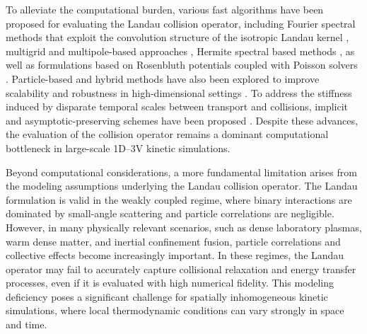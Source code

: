 \documentclass[preprint,1p,times]{elsarticle}
\theoremstyle{definition}
\theoremstyle{remark}
\begin{document}
To alleviate the computational burden, various fast algorithms have been proposed for evaluating the Landau collision operator, including Fourier spectral methods that exploit the convolution structure of the isotropic Landau kernel \cite{pareschi2000fast,filbet2002numerical,zhang2017conservative}, multigrid and multipole-based approaches \cite{buet1997fast,lemou1998multipole},  Hermite spectral based methods \cite{wang2019approximation,li2020approximation,li2021hermite}, as well as formulations based on Rosenbluth potentials \cite{Rosenbluth_PR_1957} coupled with Poisson solvers \cite{chacon2000implicit,taitano2016adaptive}. Particle-based and hybrid methods have also been explored to improve scalability and robustness in high-dimensional settings \cite{takizuka1977binary,Carrillo_JCP_2020,bailo2024collisional,Hauck_Hu_JSP_2025}. 
To address the stiffness induced by disparate temporal scales between transport and collisions, implicit and asymptotic-preserving schemes have been proposed \cite{epperlein1994implicit,chacon2000implicit,lemou2005implicit,filbet2010class,jin2011class}. 
Despite these advances, the evaluation of the collision operator remains a dominant computational bottleneck in large-scale 1D–3V kinetic simulations.

Beyond computational considerations, a more fundamental limitation arises from the modeling assumptions underlying the Landau collision operator. 
The Landau formulation is valid in the weakly coupled regime, where binary interactions are dominated by small-angle scattering and particle correlations are negligible.  However, in many physically relevant scenarios, such as dense laboratory plasmas, warm dense matter, and inertial confinement fusion, particle correlations and collective effects become increasingly important. 
In these regimes, the Landau operator may fail to accurately capture collisional relaxation and energy transfer processes, even if it is evaluated with high numerical fidelity. This modeling deficiency poses a significant challenge for spatially inhomogeneous kinetic simulations, where local thermodynamic conditions can vary strongly in space and time.
\end{document}
